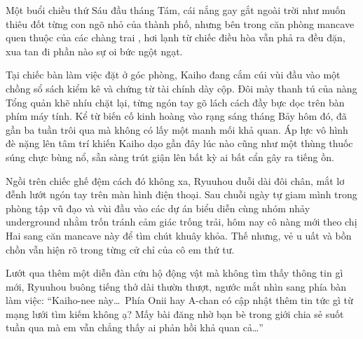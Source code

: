 \documentclass[../main.tex]{subfiles}
\begin{document}

Một buổi chiều thứ Sáu đầu tháng Tám, cái nắng gay gắt ngoài trời như muốn thiêu đốt từng con ngõ nhỏ của thành phố, nhưng bên trong căn phòng mancave quen thuộc của các chàng trai \hls, hơi lạnh từ chiếc điều hòa vẫn phả ra đều đặn, xua tan đi phần nào sự oi bức ngột ngạt.

Tại chiếc bàn làm việc đặt ở góc phòng, Kaiho đang cắm cúi vùi đầu vào một chồng sổ sách kiểm kê và chứng từ tài chính dày cộp. Đôi mày thanh tú của nàng Tổng quản khẽ nhíu chặt lại, từng ngón tay gõ lách cách đầy bực dọc trên bàn phím máy tính. Kể từ biến cố kinh hoàng vào rạng sáng tháng Bảy hôm đó, đã gần ba tuần trôi qua mà không có lấy một manh mối khả quan. Áp lực vô hình đè nặng lên tâm trí khiến Kaiho dạo gần đây lúc nào cũng như một thùng thuốc súng chực bùng nổ, sẵn sàng trút giận lên bất kỳ ai bất cẩn gây ra tiếng ồn.

Ngồi trên chiếc ghế đệm cách đó không xa, Ryuuhou duỗi dài đôi chân, mắt lơ đễnh lướt ngón tay trên màn hình điện thoại. Sau chuỗi ngày tự giam mình trong phòng tập vũ đạo và vùi đầu vào các dự án biểu diễn cùng nhóm nhảy underground nhằm trốn tránh cảm giác trống trải, hôm nay cô nàng mới theo chị Hai sang căn mancave này để tìm chút khuây khỏa. Thế nhưng, vẻ u uất và bồn chồn vẫn hiện rõ trong từng cử chỉ của cô em thứ tư.

Lướt qua thêm một diễn đàn cứu hộ động vật mà không tìm thấy thông tin gì mới, Ryuuhou buông tiếng thở dài thườn thượt, ngước mắt nhìn sang phía bàn làm việc: ``Kaiho-nee này\dots\ Phía Onii hay A-chan có cập nhật thêm tin tức gì từ mạng lưới tìm kiếm không ạ? Mấy bài đăng nhờ bạn bè trong giới chia sẻ suốt tuần qua mà em vẫn chẳng thấy ai phản hồi khả quan cả\dots''
\end{document}
